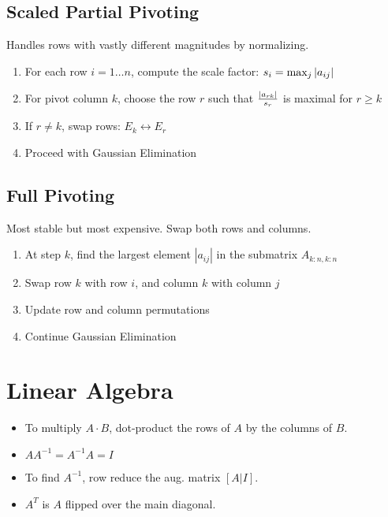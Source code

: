 \documentclass[8pt, letterpaper]{extarticle}
\begin{document}
\begin{multicols*}{3}
  \subsection{Scaled Partial Pivoting}
  Handles rows with vastly different magnitudes by normalizing.
  \begin{enumerate}
    \item For each row $i = 1 \dots n$, compute the scale factor: $s_i = \max_j \abs{a_{ij}}$
    \item For pivot column $k$, choose the row $r$ such that $\frac{\abs{a_{rk}}}{s_r}$ is maximal for $r \geq k$
    \item If $r \neq k$, swap rows: $E_k \leftrightarrow E_r$
    \item Proceed with Gaussian Elimination
  \end{enumerate}

  \subsection{Full Pivoting}
  Most stable but most expensive. Swap both rows and columns.
  \begin{enumerate}
    \item At step $k$, find the largest element $|a_{ij}|$ in the submatrix $A_{k:n,k:n}$
    \item Swap row $k$ with row $i$, and column $k$ with column $j$
    \item Update row and column permutations
    \item Continue Gaussian Elimination
  \end{enumerate}

  \section{Linear Algebra}
  \begin{itemize}
    \item To multiply $A \cdot B$, dot-product the rows of $A$ by the columns of $B$.
    \item $A A^{-1} = A^{-1} A = I$
    \item To find $A^{-1}$, row reduce the aug. matrix $[A | I]$.
    \item $A^T$ is $A$ flipped over the main diagonal.
  \end{itemize}


\end{multicols*}
\end{document}
